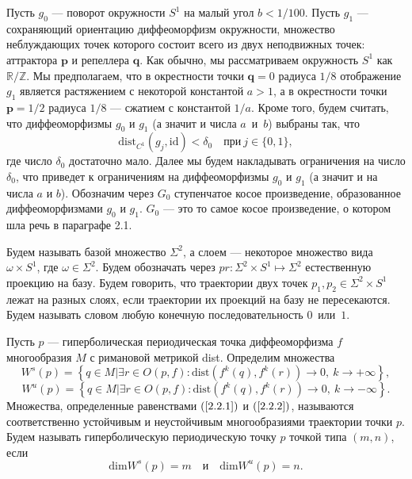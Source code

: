 \documentclass[12pt]{article}
\begin{document}
Пусть $g_0$ --- поворот окружности $S^1$ на малый угол $b<1/100$. Пусть $g_1$ --- сохраняющий ориентацию диффеоморфизм окружности, множество неблуждающих точек которого состоит всего из двух неподвижных точек: аттрактора $\textbf{p}$ и репеллера $\textbf{q}$. Как обычно, мы рассматриваем окружность $S^1$ как $\mathbb{R}/\mathbb{Z}$. Мы предполагаем, что в окрестности точки $\textbf{q}=0$ радиуса $1/8$ отображение $g_1$ является растяжением с некоторой константой $a>1$, а в окрестности точки $\textbf{p}=1/2$ радиуса $1/8$ --- сжатием с константой $1/a$. %
Кроме того, будем считать, что диффеоморфизмы $g_0$ и $g_1$ (а значит и числа $a$~и~$b$) выбраны так, что
\begin{equation}
\label{0temp}
\mbox{dist}_{C^1}(g_j,\mbox{id})<\delta_0\quad\mbox{при}\ j\in\{0,1\},
\end{equation}
где число $\delta_0$ достаточно мало. Далее мы будем накладывать ограничения на число $\delta_0$, что приведет к ограничениям на диффеоморфизмы $g_0$ и $g_1$ (а значит и на числа $a$ и $b$).
Обозначим через $G_0$ ступенчатое косое произведение, образованное диффеоморфизмами $g_0$ и $g_1$. $G_0$ --- это то самое косое произведение, о котором шла речь в параграфе 2.1.

Будем называть базой множество $\Sigma^2$, а слоем --- некоторое множество вида 
$\omega\times S^1$, где $\omega\in\Sigma^2$.
Будем обозначать через $pr:\Sigma^2\times S^1\mapsto \Sigma^2$ естественную проекцию на базу. Будем говорить, что траектории двух точек $p_1,p_2\in\Sigma^2\times S^1$ лежат на разных слоях, если траектории их проекций на базу не пересекаются.
Будем называть словом любую конечную последовательность $0$~или~$1$. 

Пусть $p$ --- гиперболическая периодическая точка диффеоморфизма $f$ многообразия $M$ с римановой метрикой dist. Определим множества
\begin{equation}
\label{2.2.1}
W^s(p)=\left\{q\in M | \exists r\in O(p,f): \mbox{dist}\left(f^{k}(q),f^k(r)\right)\longrightarrow 0,\ k\rightarrow+\infty\right\},
\end{equation}
\begin{equation}
\label{2.2.2}
W^u(p)=\left\{q\in M | \exists r\in O(p,f): 
\mbox{dist}\left(f^{k}(q),f^k(r)\right)\longrightarrow 0,\ k\rightarrow-\infty\right\}.
\end{equation}
Множества, определенные равенствами $(\ref{2.2.1})$ и $(\ref{2.2.2})$, называются соответственно устойчивым и неустойчивым многообразиями траектории точки $p$.
Будем называть гиперболическую периодическую точку $p$ точкой типа $(m,n)$, если
$$\mbox{dim}W^s(p)=m\quad\textrm{и}\quad\mbox{dim}W^u(p)=n.$$
\end{document}
